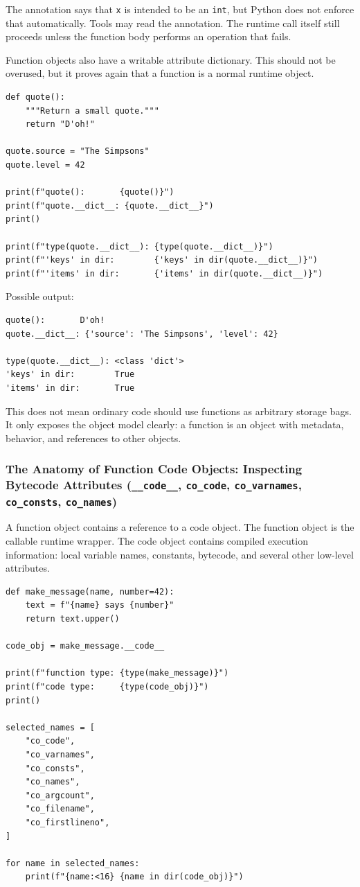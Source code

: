 The annotation says that \texttt{x} is intended to be an \texttt{int}, but Python does not enforce that automatically. Tools may read the annotation. The runtime call itself still proceeds unless the function body performs an operation that fails.

Function objects also have a writable attribute dictionary. This should not be overused, but it proves again that a function is a normal runtime object.

\begin{verbatim}
def quote():
    """Return a small quote."""
    return "D'oh!"

quote.source = "The Simpsons"
quote.level = 42

print(f"quote():       {quote()}")
print(f"quote.__dict__: {quote.__dict__}")
print()

print(f"type(quote.__dict__): {type(quote.__dict__)}")
print(f"'keys' in dir:        {'keys' in dir(quote.__dict__)}")
print(f"'items' in dir:       {'items' in dir(quote.__dict__)}")
\end{verbatim}

Possible output:

\begin{verbatim}
quote():       D'oh!
quote.__dict__: {'source': 'The Simpsons', 'level': 42}

type(quote.__dict__): <class 'dict'>
'keys' in dir:        True
'items' in dir:       True
\end{verbatim}

This does not mean ordinary code should use functions as arbitrary storage bags. It only exposes the object model clearly: a function is an object with metadata, behavior, and references to other objects.

\subsubsection{The Anatomy of Function Code Objects: Inspecting Bytecode Attributes (\texttt{\_\_code\_\_}, \texttt{co\_code}, \texttt{co\_varnames}, \texttt{co\_consts}, \texttt{co\_names})}

A function object contains a reference to a code object. The function object is the callable runtime wrapper. The code object contains compiled execution information: local variable names, constants, bytecode, and several other low-level attributes.

\begin{verbatim}
def make_message(name, number=42):
    text = f"{name} says {number}"
    return text.upper()

code_obj = make_message.__code__

print(f"function type: {type(make_message)}")
print(f"code type:     {type(code_obj)}")
print()

selected_names = [
    "co_code",
    "co_varnames",
    "co_consts",
    "co_names",
    "co_argcount",
    "co_filename",
    "co_firstlineno",
]

for name in selected_names:
    print(f"{name:<16} {name in dir(code_obj)}")
\end{verbatim}

